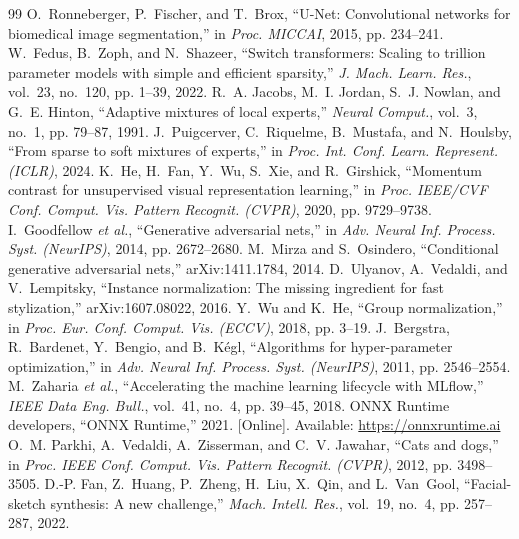 \documentclass[conference]{IEEEtran}
\begin{document}
\begin{thebibliography}{99}
 O.~Ronneberger, P.~Fischer, and T.~Brox, ``U-Net: Convolutional networks for biomedical image segmentation,'' in \emph{Proc. MICCAI}, 2015, pp. 234--241.
 W.~Fedus, B.~Zoph, and N.~Shazeer, ``Switch transformers: Scaling to trillion parameter models with simple and efficient sparsity,'' \emph{J. Mach. Learn. Res.}, vol.~23, no.~120, pp. 1--39, 2022.
 R.~A. Jacobs, M.~I. Jordan, S.~J. Nowlan, and G.~E. Hinton, ``Adaptive mixtures of local experts,'' \emph{Neural Comput.}, vol.~3, no.~1, pp. 79--87, 1991.
 J.~Puigcerver, C.~Riquelme, B.~Mustafa, and N.~Houlsby, ``From sparse to soft mixtures of experts,'' in \emph{Proc. Int. Conf. Learn. Represent. (ICLR)}, 2024.
 K.~He, H.~Fan, Y.~Wu, S.~Xie, and R.~Girshick, ``Momentum contrast for unsupervised visual representation learning,'' in \emph{Proc. IEEE/CVF Conf. Comput. Vis. Pattern Recognit. (CVPR)}, 2020, pp. 9729--9738.
 I.~Goodfellow \emph{et al.}, ``Generative adversarial nets,'' in \emph{Adv. Neural Inf. Process. Syst. (NeurIPS)}, 2014, pp. 2672--2680.
 M.~Mirza and S.~Osindero, ``Conditional generative adversarial nets,'' arXiv:1411.1784, 2014.
 D.~Ulyanov, A.~Vedaldi, and V.~Lempitsky, ``Instance normalization: The missing ingredient for fast stylization,'' arXiv:1607.08022, 2016.
 Y.~Wu and K.~He, ``Group normalization,'' in \emph{Proc. Eur. Conf. Comput. Vis. (ECCV)}, 2018, pp. 3--19.
 J.~Bergstra, R.~Bardenet, Y.~Bengio, and B.~K\'egl, ``Algorithms for hyper-parameter optimization,'' in \emph{Adv. Neural Inf. Process. Syst. (NeurIPS)}, 2011, pp. 2546--2554.
 M.~Zaharia \emph{et al.}, ``Accelerating the machine learning lifecycle with MLflow,'' \emph{IEEE Data Eng. Bull.}, vol.~41, no.~4, pp. 39--45, 2018.
 ONNX Runtime developers, ``ONNX Runtime,'' 2021. [Online]. Available: \url{https://onnxruntime.ai}
 O.~M. Parkhi, A.~Vedaldi, A.~Zisserman, and C.~V. Jawahar, ``Cats and dogs,'' in \emph{Proc. IEEE Conf. Comput. Vis. Pattern Recognit. (CVPR)}, 2012, pp. 3498--3505.
 D.-P. Fan, Z.~Huang, P.~Zheng, H.~Liu, X.~Qin, and L.~Van~Gool, ``Facial-sketch synthesis: A new challenge,'' \emph{Mach. Intell. Res.}, vol.~19, no.~4, pp. 257--287, 2022.
\end{thebibliography}
\end{document}
